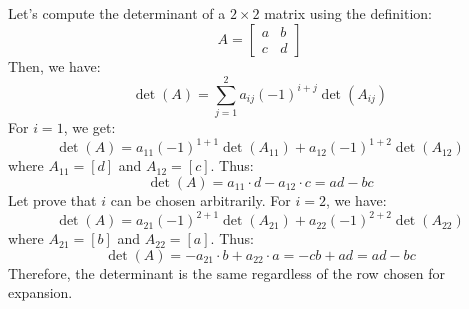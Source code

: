 \begin{eg}
    Let's compute the determinant of a \(2 \times 2\) matrix using the definition:
    \[
        A = \begin{bmatrix}
            a & b \\
            c & d
        \end{bmatrix}
    \]
    Then, we have:
    \[
        \det(A) = \sum_{j = 1}^{2} a_{ij} (-1)^{i+j} \det(A_{ij})
    \]
    For \(i = 1\), we get:
    \[
        \det(A) = a_{11} (-1)^{1+1} \det(A_{11}) + a_{12} (-1)^{1+2} \det(A_{12})
    \]
    where \(A_{11} = [d]\) and \(A_{12} = [c]\). Thus:
    \[
        \det(A) = a_{11} \cdot d - a_{12} \cdot c = ad - bc
    \]
    Let prove that $i$ can be chosen arbitrarily. For \(i = 2\), we have:
    \[
        \det(A) = a_{21} (-1)^{2+1} \det(A_{21}) + a_{22} (-1)^{2+2} \det(A_{22})
    \]
    where \(A_{21} = [b]\) and \(A_{22} = [a]\). Thus:
    \[
        \det(A) = -a_{21} \cdot b + a_{22} \cdot a = -cb + ad = ad - bc
    \]
    Therefore, the determinant is the same regardless of the row chosen for expansion.
\end{eg}

